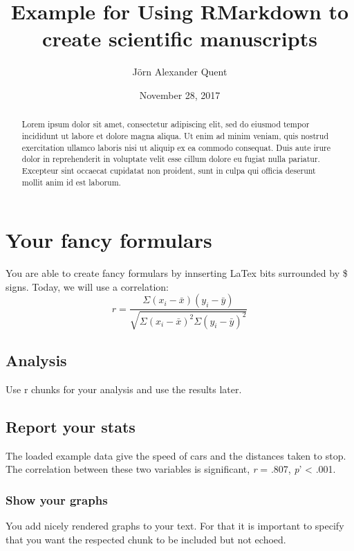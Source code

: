 \documentclass[12pt,]{article}
\title{Example for Using RMarkdown to create scientific manuscripts}
\author{Jörn Alexander Quent}
\date{November 28, 2017}
\begin{document}
\maketitle
\begin{abstract}
Lorem ipsum dolor sit amet, consectetur adipiscing elit, sed do eiusmod
tempor incididunt ut labore et dolore magna aliqua. Ut enim ad minim
veniam, quis nostrud exercitation ullamco laboris nisi ut aliquip ex ea
commodo consequat. Duis aute irure dolor in reprehenderit in voluptate
velit esse cillum dolore eu fugiat nulla pariatur. Excepteur sint
occaecat cupidatat non proident, sunt in culpa qui officia deserunt
mollit anim id est laborum.
\end{abstract}

{
\setcounter{tocdepth}{3}
\tableofcontents
}
\section{Your fancy formulars}\label{your-fancy-formulars}

You are able to create fancy formulars by innserting LaTex bits
surrounded by \$ signs. Today, we will use a correlation:
\[r = \frac{\Sigma(x_i - \bar{x})(y_i - \bar{y})}{\sqrt{\Sigma(x_i - \bar{x})^2\Sigma(y_i - \bar{y})^2}}\]

\subsection{Analysis}\label{analysis}

Use r chunks for your analysis and use the results later.

\subsection{Report your stats}\label{report-your-stats}

The loaded example data give the speed of cars and the distances taken
to stop. The correlation between these two variables is significant,
\emph{r} = .807, \emph{p}' \textless{} .001.

\subsubsection{Show your graphs}\label{show-your-graphs}

You add nicely rendered graphs to your text. For that it is important to
specify that you want the respected chunk to be included but not echoed.
\end{document}
